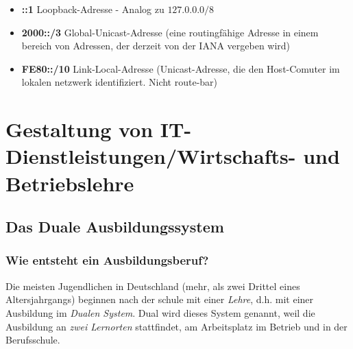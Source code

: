 \documentclass[a4paper, 12pt]{report}
\begin{document}
\begin{itemize}
	\item \textbf{::1} Loopback-Adresse - Analog zu $127.0.0.0/8$
	\item \textbf{2000::/3} Global-Unicast-Adresse (eine routingfähige 
		Adresse in einem bereich von Adressen, der derzeit von der IANA 
		vergeben wird)
	\item \textbf{FE80::/10} Link-Local-Adresse (Unicast-Adresse, die den 
		Host-Comuter im lokalen netzwerk identifiziert. Nicht route-bar)
\end{itemize}

\chapter{Gestaltung von IT-Dienstleistungen/Wirtschafts- und Betriebslehre}

\section{Das Duale Ausbildungssystem}

\subsection{Wie entsteht ein Ausbildungsberuf?}

Die meisten Jugendlichen in Deutschland (mehr, als zwei Drittel eines 
Altersjahrgangs) beginnen nach der schule mit einer \emph{Lehre}, d.h. mit 
einer Ausbildung im \emph{Dualen System}. Dual wird dieses System genannt, weil
die Ausbildung an \emph{zwei Lernorten} stattfindet, am Arbeitsplatz im Betrieb
und in der Berufsschule. \\
\end{document}
